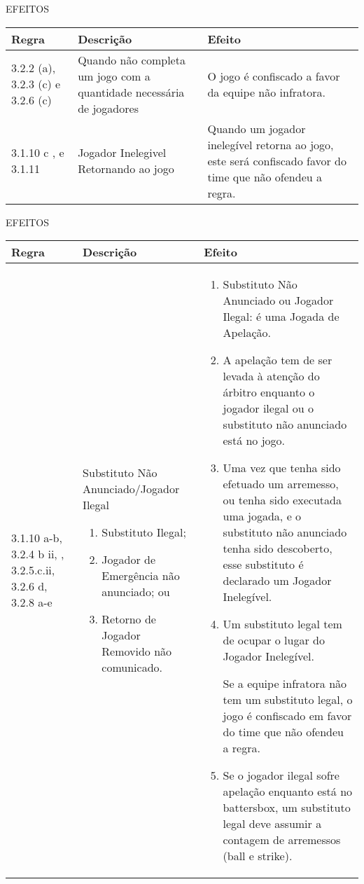 EFEITOS

{\footnotesize\begin{tabular}{p{20mm}p{50mm}p{90mm}}
		Regra& Descrição & Efeito\\\hline
		3.2.2 (a), 3.2.3 (c) e 3.2.6 (c) &  Quando não completa um jogo com a quantidade necessária de jogadores
		& O jogo é confiscado a favor da equipe não infratora.
		\\[4mm]\hline
		3.1.10 c , e 3.1.11 & Jogador Inelegivel Retornando ao jogo &
		Quando um jogador inelegível retorna ao jogo, este será confiscado favor do time que não ofendeu a regra.
\end{tabular}}


\begin{landscape}
	EFEITOS

	{\footnotesize\begin{tabular}{p{20mm}p{50mm}p{156mm}}
			Regra& Descrição & Efeito\\\hline
			3.1.10 a-b, 3.2.4 b ii, , 3.2.5.c.ii, 3.2.6 d, 3.2.8 a-e &
			Substituto Não Anunciado/Jogador Ilegal
			\begin{enumerate}[label=(\alph*)]
				\item   Substituto Ilegal;
				\item  Jogador de Emergência não anunciado; ou
				\item  Retorno de Jogador Removido não comunicado.
			\end{enumerate}
			&
			\begin{enumerate}[label=(\alph*), itemsep=-1mm]
				\item Substituto Não Anunciado ou Jogador Ilegal: é uma Jogada de Apelação.
				\item A apelação tem de ser levada à atenção do árbitro enquanto o jogador ilegal ou o substituto não anunciado está no jogo.
				\item Uma vez que tenha sido efetuado um arremesso, ou tenha sido executada uma jogada, e o substituto não anunciado tenha sido descoberto, esse substituto é declarado um Jogador Inelegível.
				\item Um substituto legal tem de ocupar o lugar do Jogador Inelegível.

				Se a equipe infratora não tem um substituto legal, o jogo é confiscado em favor do time que não ofendeu a regra.

				\item Se o jogador ilegal sofre apelação enquanto está no \gls{battersbox}, um substituto legal deve assumir a contagem de arremessos (\gls{ball} e \gls{strike}).


\end{enumerate}
\end{tabular}}
\end{landscape}
